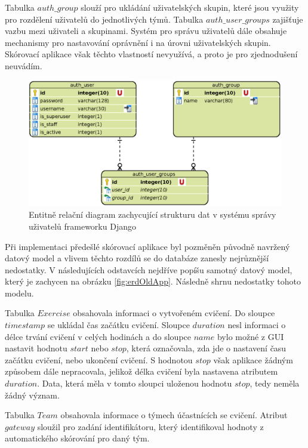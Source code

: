 \documentclass[
  digital, %
  twoside, %
  table,   %
  lof,     %
  lot,     %
]{fithesis3}
\begin{document}
Tabulka $auth\_group$ slouží pro ukládání uživatelských skupin, které jsou využity pro rozdělení uživatelů do jednotlivých týmů. Tabulka $auth\_user\_groups$ zajišťuje vazbu mezi uživateli a skupinami. Systém pro správu uživatelů dále obsahuje mechanismy pro nastavování oprávnění i na úrovni uživatelských skupin. Skórovací aplikace však těchto vlastností nevyužívá, a proto je pro zjednodušení neuvádím.

\begin{figure}[t!]
    \centering
    \includegraphics[width=13cm]{images/ERD-django.eps}
    \caption{Entitně relační diagram zachycující strukturu dat v systému správy uživatelů frameworku Django}
    \label{fig:erdDjango}
\end{figure}

Při implementaci předešlé skórovací aplikace byl pozměněn původně navržený datový model a vlivem těchto rozdílů se do databáze zanesly nejrůznější nedostatky. V následujících odstavcích nejdříve popíšu samotný datový model, který je zachycen na obrázku \ref{fig:erdOldApp}. Následně shrnu nedostatky tohoto modelu. 

Tabulka $Exercise$ obsahovala informaci o vytvořeném cvičení. Do sloupce $timestamp$ se ukládal čas začátku cvičení. Sloupce $duration$ nesl informaci o délce trvání cvičení v celých hodinách a do sloupce $name$ bylo možné z GUI nastavit hodnotu $start$ nebo $stop$, která označovala, zda jde o nastavení času začátku cvičení, nebo ukončení cvičení. S hodnotou $stop$ však aplikace žádným způsobem dále nepracovala, jelikož délka cvičení byla nastavena atributem $duration$. Data, která měla v tomto sloupci uloženou hodnotu $stop$, tedy neměla žádný význam.

Tabulka $Team$ obsahovala informace o týmech účastnících se cvičení. Atribut $gateway$ sloužil pro zadání identifikátoru, který identifikoval hodnoty z automatického skórování pro daný tým.
\end{document}
